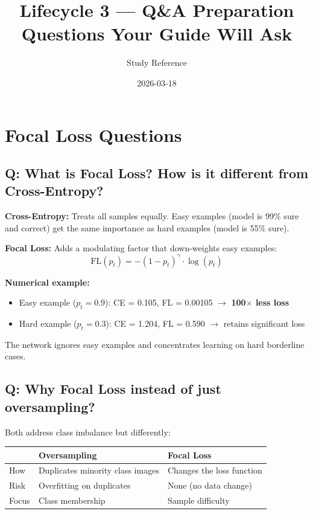 \documentclass[11pt]{article}
\title{Lifecycle 3 --- Q\&A Preparation \\ \large Questions Your Guide Will Ask}
\author{Study Reference}
\date{2026-03-18}
\begin{document}
\maketitle

\tableofcontents
\newpage

\section{Focal Loss Questions}

\subsection{Q: What is Focal Loss? How is it different from Cross-Entropy?}

\textbf{Cross-Entropy:} Treats all samples equally. Easy examples (model is 99\% sure and correct) get the same importance as hard examples (model is 55\% sure).

\textbf{Focal Loss:} Adds a modulating factor that down-weights easy examples:
\[
\text{FL}(p_t) = -(1 - p_t)^\gamma \cdot \log(p_t)
\]

\textbf{Numerical example:}
\begin{itemize}[noitemsep]
    \item Easy example ($p_t = 0.9$): CE = 0.105, FL = 0.00105 $\to$ \textbf{100$\times$ less loss}
    \item Hard example ($p_t = 0.3$): CE = 1.204, FL = 0.590 $\to$ retains significant loss
\end{itemize}

The network ignores easy examples and concentrates learning on hard borderline cases.

\subsection{Q: Why Focal Loss instead of just oversampling?}

Both address class imbalance but differently:

\begin{table}[H]
    \centering
    \renewcommand{\arraystretch}{1.3}
    \begin{tabular}{lp{5cm}p{5cm}}
        \toprule
        & \textbf{Oversampling} & \textbf{Focal Loss} \\
        \midrule
        How & Duplicates minority class images & Changes the loss function \\
        Risk & Overfitting on duplicates & None (no data change) \\
        Focus & Class membership & Sample difficulty \\
        \bottomrule
    \end{tabular}
\end{table}
\end{document}
